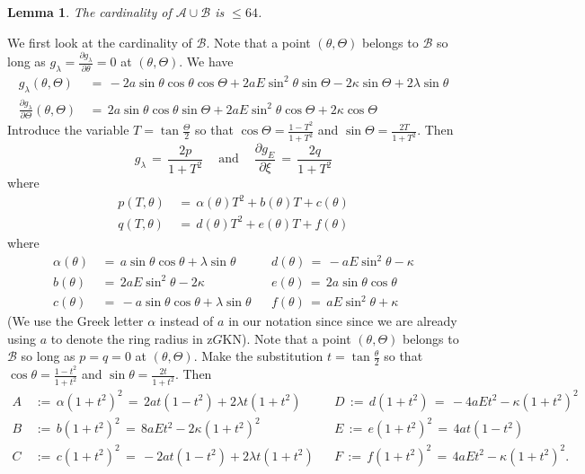 \documentclass[11 pt]{article}
\newtheorem{lem}[thm]{Lemma}%
\renewcommand\({\left(}
\renewcommand\){\right)}
\newcommand\<{\langle}
\renewcommand\>{\rangle}
\newcommand\8{\infty}
\renewcommand\a{\alpha}
\renewcommand\th{\theta}
\newcommand{\pd}{\partial}
\newcommand{\mc}{\mathcal}
\begin{document}
\medskip
\medskip

\begin{lem}\label{resultant lem for Th}
The cardinality of $\mc{A} \cup \mc{B}$ is $\leq 64$.
\end{lem}

\proof
We first look at the cardinality of $\mc{B}$. Note that a point $(\theta, \Theta)$ belongs to $\mc{B}$ so long as $g_\lambda = \frac{\pd g_\lambda}{\pd \theta} = 0$ at $(\theta, \Theta)$. We have
\begin{align*}
g_\lambda(\theta, \Theta) \,&=\, -2a\sin\theta\cos\theta\cos\Theta + 2aE \sin^2\theta \sin \Theta -2\kappa \sin \Theta + 2\lambda \sin \theta
\\
\frac{\pd g_\lambda}{\pd \Theta}(\theta, \Theta) \,&=\, 2a\sin\theta\cos\theta\sin\Theta + 2aE\sin^2\theta\cos\Theta + 2\kappa\cos\Theta
\end{align*}
Introduce the variable $T = \tan \frac{\Theta}{2}$ so that $\cos\Theta = \frac{1-T^2}{1+T^2}$ and $\sin \Theta = \frac{2T}{1+T^2}$.  
Then 
\[
g_\lambda \,=\, \frac{2p}{1 + T^2} \:\:\:\: \text{ and } \:\:\:\: \frac{\pd g_E}{\pd \xi} \,=\, \frac{2q}{1 + T^2}
\]
where
\begin{align*}
p(T, \theta) \,&=\, \a(\theta)T^2 + b(\theta)T + c(\theta)
\\
q(T,\theta) \,&=\, d(\theta)T^2 + e(\theta)T + f(\theta)
\end{align*}
where
\begin{align*}
\a(\theta) \,&=\, a\sin\theta\cos\theta + \lambda \sin \theta  &&d(\theta) \,=\, -aE\sin^2\theta -\kappa
\\
b(\theta) \,&=\, 2aE\sin^2\theta -2\kappa  &&e(\theta) \,=\, 2a\sin\theta\cos\theta
\\
c(\theta) \,&=\, -a\sin\theta\cos\theta + \lambda\sin\theta  &&f(\theta) \,=\, aE\sin^2\theta + \kappa
\end{align*}
(We use the Greek letter $\a$ instead of $a$ in our notation since since we are already using $a$ to denote the ring radius in z$G$KN). Note that a point $(\theta, \Theta)$ belongs to $\mc{B}$ so long as $p = q = 0$ at $(\theta, \Theta)$. Make the substitution $t = \tan\frac{\theta}{2}$ so that $\cos\th = \frac{1 - t^2}{1 + t^2}$ and $\sin \th = \frac{2t}{1 + t^2}$. Then
\begin{align*}
A \,&:=\, \a(1+t^2)^2 \,=\, 2at(1-t^2) + 2\lambda t(1+t^2)  && D \,:=\, d(1+t^2) \,=\, -4aEt^2 -\kappa (1+t^2)^2
\\
B \,&:=\, b(1+t^2)^2 \,=\, 8aEt^2 -2\kappa(1+t^2)^2
&& E \,:=\, e(1+t^2)^2 \,=\,4a t(1-t^2)
\\
C \,&:=\, c(1+t^2)^2 \,=\, -2at(1-t^2) + 2\lambda t(1+t^2)
&& F \,:=\, f(1+t^2)^2 \,=\, 4aEt^2 -\kappa (1+t^2)^2.
\end{align*}
\end{document}
